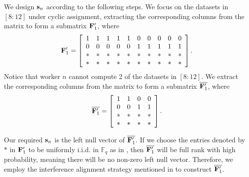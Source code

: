\documentclass[conference,letterpaper]{IEEEtran}
\begin{document}
\begin{example}
We design ${\bf s}_n$ according to the following steps. We focus on the datasets in $[8:12]$ under cyclic assignment, extracting the corresponding columns from the matrix to form a submatrix ${\bf F}^{\prime}_1$, where
\begin{equation} \label{eq:scheme 4 sub transmission}
{\bf F}^{\prime}_1= \left[
\begin{array}{cccccccccc}
  1 & 1 & 1 & 1 & 1 & 0 & 0 & 0 & 0 & 0  \\
  0 & 0 & 0 & 0 & 0 & 1 & 1 & 1 & 1 & 1 \\
  * & * & * & * & * & * & * & * & * & * \\
  * & * & * & * & * & * & * & * & * & *
\end{array}
 \right].
\end{equation}
Notice that worker $n$ cannot compute 2 of the datasets in $[8:12]$. We extract the corresponding columns from the matrix to form a submatrix $\overline{{\bf F}^{\prime}_1}$,
where
\begin{equation} \label{eq:scheme 4 sub sub transmission}
\overline{{\bf F}^{\prime}_1}= \left[
\begin{array}{cccc}
  1 & 1 & 0 & 0  \\
  0 & 0 & 1 & 1 \\
  * & * & * & *  \\
  * & * & * & *
\end{array}
 \right].
\end{equation}

Our required ${\bf s}_n$ is the left null vector of $\overline{{\bf F}^{\prime}_1}$. If we choose the entries denoted by $*$ in ${\bf F}^{\prime}_1$ to be uniformly i.i.d. in $\mathbb{F}_q$ as in \cite{wan2022secure}, then $\overline{{\bf F}^{\prime}_1}$ will be full rank with high probability, meaning there will be no non-zero left null vector. Therefore, we employ the interference alignment strategy mentioned in \cite{limit} to construct $\overline{{\bf F}^{\prime}_1}$.


\end{example}
\end{document}
